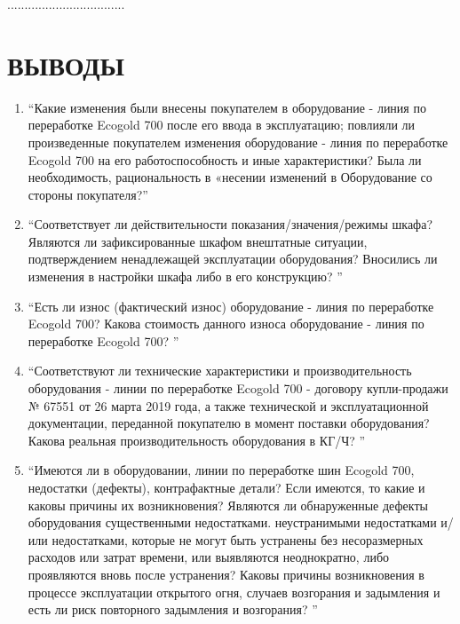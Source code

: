 ..................................











\section{ВЫВОДЫ}


\begin{enumerate}
	
\item \enquote{Какие изменения были внесены покупателем в оборудование - линия по переработке Ecogold 700 после его ввода в эксплуатацию; повлияли ли произведенные покупателем изменения оборудование - линия по переработке Ecogold 700 на его работоспособность и иные характеристики? Была ли необходимость, рациональность в «несении изменений в Оборудование со стороны покупателя?}

\item \enquote{Соответствует ли действительности показания/значения/режимы шкафа? Являются ли зафиксированные шкафом внештатные ситуации, подтверждением ненадлежащей эксплуатации оборудования? Вносились ли изменения в настройки шкафа либо в его конструкцию? }

\item \enquote{Есть ли износ (фактический износ) оборудование - линия по переработке Ecogold 700? Какова стоимость данного износа оборудование - линия по переработке Ecogold 700? }

\item \enquote{Соответствуют ли технические характеристики и производительность оборудования - линии по переработке Ecogold 700 - договору купли-продажи № 67551 от 26 марта 2019 года, а также технической и эксплуатационной документации, переданной покупателю в момент поставки оборудования? Какова реальная производительность оборудования в КГ/Ч? }

\item \enquote{Имеются ли в оборудовании, линии по переработке шин Ecogold 700, недостатки (дефекты), контрафактные детали? Если имеются, то какие и каковы причины  их возникновения? Являются ли обнаруженные дефекты оборудования существенными недостатками. неустранимыми недостатками и/или недостатками, которые не могут быть устранены без несоразмерных расходов или затрат времени, или выявляются неоднократно, либо проявляются вновь после устранения? Каковы причины возникновения в процессе эксплуатации открытого огня, случаев возгорания и задымления и есть ли риск повторного задымления и возгорания? }


\end{enumerate}
